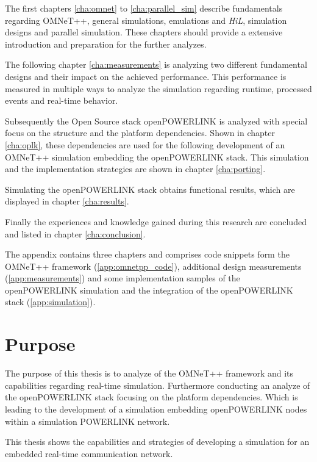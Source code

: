 The first chapters \ref{cha:omnet} to \ref{cha:parallel_sim} describe fundamentals regarding OMNeT++, general simulations, emulations and \emph{HiL}, simulation designs and parallel simulation.
These chapters should provide a extensive introduction and preparation for the further analyzes.

The following chapter \ref{cha:measurements} is analyzing two different fundamental designs and their impact on the achieved performance.
This performance is measured in multiple ways to analyze the simulation regarding runtime, processed events and real-time behavior.

Subsequently the Open Source stack openPOWERLINK is analyzed with special focus on the structure and the platform dependencies.
Shown in chapter \ref{cha:oplk}, these dependencies are used for the following development of an OMNeT++ simulation embedding the openPOWERLINK stack.
This simulation and the implementation strategies are shown in chapter \ref{cha:porting}.

Simulating the openPOWERLINK stack obtains functional results, which are displayed in chapter \ref{cha:results}.

Finally the experiences and knowledge gained during this research are concluded and listed in chapter \ref{cha:conclusion}.

The appendix contains three chapters and comprises code snippets form the OMNeT++ framework (\ref{app:omnetpp_code}), additional design measurements (\ref{app:measurements}) and some implementation samples of the openPOWERLINK simulation and the integration of the openPOWERLINK stack (\ref{app:simulation}).

\section{Purpose}
The purpose of this thesis is to analyze of the OMNeT++ framework and its capabilities regarding real-time simulation.
Furthermore conducting an analyze of the openPOWERLINK stack focusing on the platform dependencies.
Which is leading to the development of a simulation embedding openPOWERLINK nodes within a simulation POWERLINK network.

This thesis shows the capabilities and strategies of developing a simulation for an embedded real-time communication network.